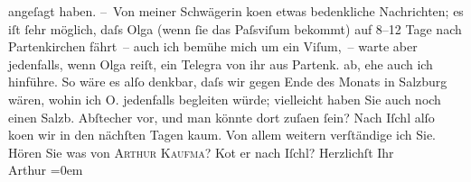 \begin{ledgroupsized}[t]{13cm}
               angeſagt haben.\pend
           \pstart
           – Von meiner Schwägerin ko{\geminationm}en etwas bedenkliche Nachrichten; es iſt ſehr möglich,
               daſs Olga (wenn ſie das Paſsviſum bekommt) auf
               8–12 Tage nach Partenkirchen fährt – auch ich
               bemühe mich um ein Viſum, – warte aber jedenfalls, wenn Olga\strikeout{\textcolor{gray}{×}\-\textcolor{gray}{×}\-\textcolor{gray}{×}\-\textcolor{gray}{×}} reiſt, ein Telegra{\geminationm} von ihr aus Partenk. ab, ehe auch ich hinführe. So wäre es alſo denkbar,
               daſs wir gegen Ende des Monats in Salzburg wären,
               wohin ich O. jedenfalls begleiten würde;
               vielleicht haben Sie auch noch einen Salzb. Abſtecher
               vor, und man könnte dort zuſa{\geminationm}en ſein? Nach Iſchl alſo ko{\geminationm}en wir in
               den nächſten Tagen kaum. Von allem weitern verſtändige ich Sie. Hören Sie was von \textsc{Arthur Kaufma{\geminationn}}? Ko{\geminationm}t er nach Iſchl?\pend
           \pstart
           Herzlichſt Ihr{\\[\baselineskip]}\spacefill\mbox{Arthur}\pend
           \leftskip=0em{}\endnumbering{}\end{ledgroupsized}  \newcommand{\dateiname}{L02239}\newcommand{\titel}{Arthur Schnitzler an Richard Beer-Hofmann, 23. 8. 1916}\newcommand{\editorInnen}{Martin Anton Müller und Gerd-Hermann Susen}
            \footnotesize
\begin{ledgroupsized}[t]{11.5cm}
\end{ledgroupsized}
         
      